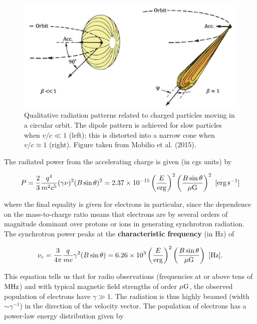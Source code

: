 \documentclass[a4paper,10pt]{article}
\begin{document}
\begin{figure}[h]
    \centering
    \includegraphics[width=12cm]{figures/SynchrotronOrbits.png}
    \caption{\footnotesize{Qualitative radiation patterns related to charged particles moving in a circular orbit. The dipole pattern is achieved for slow particles when $v/c\ll1$ (left); this is distorted into a narrow cone when $v/c\approx1$ (right). Figure taken from Mobilio et al. (2015).}}
    \label{fig:synchrotronorbits}
\end{figure}

{\noindent}The radiated power from the accelerating charge is given (in cgs units) by

\begin{align*}
    P = \frac{2}{3}\frac{q^4}{m^2c^5} (\gamma\nu)^2 (B\sin\theta)^2 = 2.37\times10^{-15} \left(\frac{E}{{\rm erg}}\right)^2 \left(\frac{B\sin\theta}{\mu{\rm G}}\right)^2 ~ [{\rm erg\,s^{-1}}]
\end{align*}

{\noindent}where the final equality is given for electrons in particular, since the dependence on the mass-to-charge ratio means that electrons are by several orders of magnitude dominant over protons or ions in generating synchrotron radiation. The synchrotron power peaks at the \textbf{characteristic frequency} (in Hz) of

\begin{align*}
    \nu_c = \frac{3}{4\pi}\frac{q}{mc}\gamma^2(B\sin\theta) = 6.26\times10^3 \left(\frac{E}{{\rm erg}}\right)^2 \left(\frac{B\sin\theta}{\mu{\rm G}}\right) ~ [{\rm Hz}].
\end{align*}

{\noindent}This equation tells us that for radio observations (frequencies at or above tens of ${\rm MHz}$) and with typical magnetic field strengths of order $\mu{\rm G}$, the observed population of electrons have $\gamma\gg1$. The radiation is thus highly beamed (width $\sim\gamma^{-1}$) in the direction of the velocity vector. The population of electrons has a power-law energy distribution given by
\end{document}
